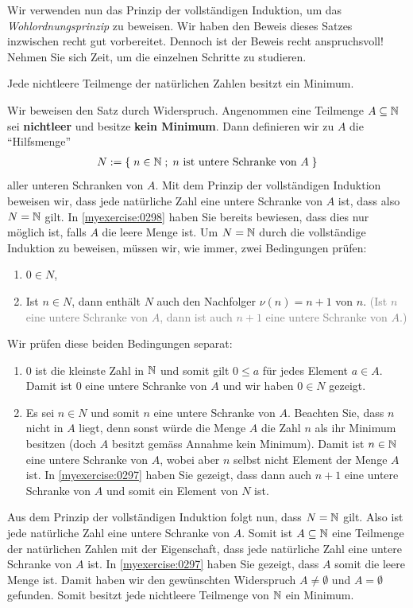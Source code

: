 \noindent
Wir verwenden nun das Prinzip der vollständigen Induktion, um das \textit{Wohlordnungsprinzip} zu beweisen.
Wir haben den Beweis dieses Satzes inzwischen recht gut vorbereitet. Dennoch ist der Beweis recht anspruchsvoll!
Nehmen Sie sich Zeit, um die einzelnen Schritte zu studieren.
\begin{mytheorem}[Wohlordnungsprinzip]\label{mytheorem:MinimumN}
	Jede nichtleere Teilmenge der natürlichen Zahlen besitzt ein Minimum.
\end{mytheorem}
\begin{myproof}
	Wir beweisen den Satz durch Widerspruch. Angenommen eine Teilmenge $A\subseteq\mathbb{N}$ sei \textbf{nichtleer} und besitze \textbf{kein Minimum}. Dann definieren wir zu $A$ die \enquote{Hilfsmenge}
	\begin{align*}
		N := \left\{\;n\in\mathbb{N} \; ; \; \text{$n$ ist untere Schranke von $A$} \;\right\}
	\end{align*}
	aller unteren Schranken von $A$.
	Mit dem Prinzip der vollständigen Induktion beweisen wir, dass jede natürliche Zahl eine untere Schranke von $A$ ist, dass also $N=\mathbb{N}$ gilt.
	In \cref{myexercise:0298} haben Sie bereits bewiesen, dass dies nur möglich ist, falls $A$ die leere Menge ist.
	Um $N = \mathbb{N}$ durch die vollständige Induktion zu beweisen, müssen wir, wie immer, zwei Bedingungen prüfen:
	\begin{enumerate}
		\item $0\in N$,
		\item Ist $n\in N$, dann enthält $N$ auch den Nachfolger $\nu(n) = n+1$ von $n$. \textcolor{Gray}{(Ist $n$ eine untere Schranke von $A$, dann ist auch $n+1$ eine untere Schranke von $A$.)}
	\end{enumerate}
	Wir prüfen diese beiden Bedingungen separat:
	\begin{enumerate}
		\item $0$ ist die kleinste Zahl in $\mathbb{N}$ und somit gilt $0\leq a$ für jedes Element $a\in A$. Damit ist $0$ eine untere Schranke von $A$ und wir haben $0\in N$ gezeigt. \checkmark
		\item Es sei $n\in N$ und somit $n$ eine untere Schranke von $A$. Beachten Sie, dass $n$ nicht in $A$ liegt, denn sonst würde die Menge $A$ die Zahl $n$ als ihr Minimum besitzen (doch $A$ besitzt gemäss Annahme kein Minimum). Damit ist $n\in\mathbb{N}$ eine untere Schranke von $A$, wobei aber $n$ selbst nicht Element der Menge $A$ ist. In \cref{myexercise:0297} haben Sie gezeigt, dass dann auch $n+1$ eine untere Schranke von $A$ und somit ein Element von $N$ ist. \checkmark
	\end{enumerate}
	Aus dem Prinzip der vollständigen Induktion folgt nun, dass $N=\mathbb{N}$ gilt. Also ist jede natürliche Zahl eine untere Schranke von $A$. Somit ist $A\subseteq\mathbb{N}$ eine Teilmenge der natürlichen Zahlen mit der Eigenschaft, dass jede natürliche Zahl eine untere Schranke von $A$ ist. In \cref{myexercise:0297} haben Sie gezeigt, dass $A$ somit die leere Menge ist. Damit haben wir den gewünschten Widerspruch $A\neq\emptyset$ und $A=\emptyset$ gefunden. Somit besitzt jede nichtleere Teilmenge von $\mathbb{N}$ ein Minimum.
\end{myproof}

